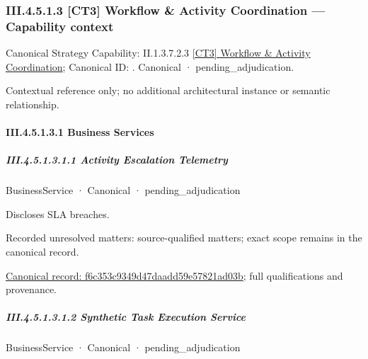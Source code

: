 \subsubsection*{III.4.5.1.3 [CT3] Workflow \& Activity Coordination — Capability context}
\label{navigation:III.4.5.1.3}

{\small Canonical Strategy Capability: II.1.3.7.2.3 \hyperref[element:94c683c7588f475e973b58cb226345db]{[CT3] Workflow \& Activity Coordination}; Canonical ID: \texttt{}. Canonical · pending\_adjudication.}\par
Contextual reference only; no additional architectural instance or semantic relationship.\par
\paragraph*{III.4.5.1.3.1 Business Services}
\label{navigation:III.4.5.1.3.1}

\subparagraph*{III.4.5.1.3.1.1 Activity Escalation Telemetry}
\label{navigation:III.4.5.1.3.1.1}

\label{element:f6c353c9349d47daadd59e57821ad03b}
{\small BusinessService · Canonical · pending\_adjudication}\par

Discloses SLA breaches.


{\small Recorded unresolved matters: source-qualified matters; exact scope remains in the canonical record.}\par
{\footnotesize \href{../../../../../../../continuum/business/business-service/f6c353c9349d47daadd59e57821ad03b.md}{Canonical record: f6c353c9349d47daadd59e57821ad03b}; full qualifications and provenance.}\par
\subparagraph*{III.4.5.1.3.1.2 Synthetic Task Execution Service}
\label{navigation:III.4.5.1.3.1.2}

\label{element:57317da133ba4e29bde3997921f92e2e}
{\small BusinessService · Canonical · pending\_adjudication}\par

